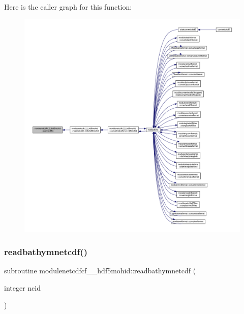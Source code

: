 Here is the caller graph for this function\+:\nopagebreak
\begin{figure}[H]
\begin{center}
\leavevmode
\includegraphics[width=350pt]{namespacemodulenetcdfcf__2__hdf5mohid_acf2bf806a4a00a849877321743f4ab04_icgraph}
\end{center}
\end{figure}
\mbox{\label{namespacemodulenetcdfcf__2__hdf5mohid_af7f83fb951c020a987c7376d899f56e1}} 
\subsubsection{\texorpdfstring{readbathymnetcdf()}{readbathymnetcdf()}}
{\footnotesize\ttfamily subroutine modulenetcdfcf\+\_\+\_\+hdf5mohid\+::readbathymnetcdf (\begin{DoxyParamCaption}\item[{integer}]{ncid }\end{DoxyParamCaption})\hspace{0.3cm}{\ttfamily [private]}}

